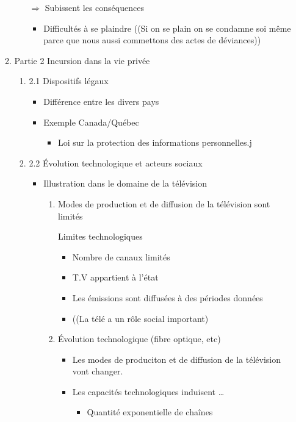 \documentclass[11pt]{article}
\begin{document}
\begin{enumerate}
\begin{enumerate}
\begin{enumerate}
\(\Rightarrow\) Subissent les conséquences
\begin{itemize}
\item Difficultés à se plaindre ((Si on se plain on se condamne soi même parce que
nous aussi commettons des actes de déviances))
\end{itemize}
\end{enumerate}

\item Partie 2 Incursion dans la vie privée
\label{sec:org9bc97f0}
\begin{enumerate}
\item 2.1 Dispositifs légaux
\label{sec:org179826c}
\begin{itemize}
\item Différence entre les divers pays
\item Exemple Canada/Québec
\begin{itemize}
\item Loi sur la protection des informations personnelles.j
\end{itemize}
\end{itemize}


\item 2.2 Évolution technologique et acteurs sociaux
\label{sec:org0ac1a7a}
\begin{itemize}
\item Illustration dans le domaine de la télévision
\begin{enumerate}
\item Modes de production et de diffusion de la télévision sont limités

Limites technologiques

\begin{itemize}
\item Nombre de canaux limités

\item T.V appartient à l'état

\item Les émissions sont diffusées à des périodes données

\item ((La télé a un rôle social important)
\end{itemize}

\item Évolution technologique (fibre optique, etc)
\begin{itemize}
\item Les modes de produciton et de diffusion de la télévision vont changer.
\item Les capacités technologiques induisent \ldots{}
\begin{itemize}
\item Quantité exponentielle de chaînes


\end{itemize}
\end{itemize}
\end{enumerate}
\end{itemize}
\end{enumerate}
\end{enumerate}
\end{enumerate}
\end{document}
